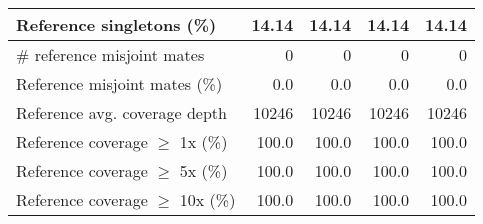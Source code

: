 \documentclass[12pt,a4paper]{article}
\begin{document}
\begin{table}[ht]
\begin{center}
\begin{tabular}{|l*{4}{|r}|}
Reference singletons (\%) & 14.14 & 14.14 & 14.14 & 14.14 \\ \hline
\# reference misjoint mates & 0 & 0 & 0 & 0 \\ \hline
Reference misjoint mates (\%) & 0.0 & 0.0 & 0.0 & 0.0 \\ \hline
Reference avg. coverage depth & 10246 & 10246 & 10246 & 10246 \\ \hline
Reference coverage $\geq$ 1x (\%) & 100.0 & 100.0 & 100.0 & 100.0 \\ \hline
Reference coverage $\geq$ 5x (\%) & 100.0 & 100.0 & 100.0 & 100.0 \\ \hline
Reference coverage $\geq$ 10x (\%) & 100.0 & 100.0 & 100.0 & 100.0 \\ \hline
\end{tabular}
\end{center}
\end{table}
\end{document}
